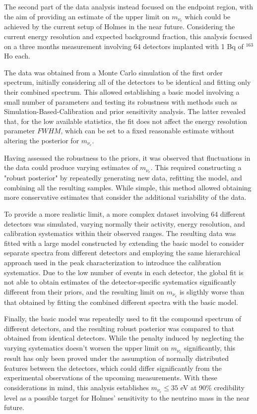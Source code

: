 The second part of the data analysis instead focused on the endpoint region, with the aim of providing an estimate of the upper limit on \(m_{\nu_{e}}\) which could be achieved by the current setup of Holmes in the near future. Considering the current energy resolution and expected background fraction, this analysis focused on a three months measurement involving 64 detectors implanted with 1 Bq of \(^{163}\)Ho each.

The data was obtained from a Monte Carlo simulation of the first order spectrum, initially considering all of the detectors to be identical and
fitting only their combined spectrum. This allowed establishing a basic model involving a small number of parameters
and testing its robustness with methods such as Simulation-Based-Calibration and prior sensitivity analysis. The latter
revealed that, for the low available statistics, the fit does not affect the energy resolution parameter \(FWHM\),
which can be set to a fixed reasonable estimate without altering the posterior for \(m_{\nu_{e}}\).

Having assessed the robustness to the priors, it was observed that fluctuations in the data could produce varying
estimates of \(m_{\nu_{e}}\). This required constructing a "robust posterior" by repeatedly generating new data,
refitting the model, and combining all the resulting samples. While simple, this method allowed obtaining more conservative estimates that consider the additional variability of the data.

To provide a more realistic limit, a more complex dataset involving 64 different detectors was simulated, varying normally their activity, energy
resolution, and calibration systematics within their observed ranges. The resulting data was fitted with a large model
constructed by extending the basic model to consider separate spectra from different detectors and employing the same hierarchical
approach used in the peak characterization to introduce the calibration systematics. Due to the low number of events in
each detector, the global fit is not able to obtain estimates of the detector-specific
systematics significantly different from their priors, and the resulting limit on \(m_{\nu_{e}}\) is sligthly worse than that obtained by fitting the combined different spectra with the basic model.

Finally, the basic model was repeatedly used to fit the compound spectrum of different detectors, and the resulting robust posterior was compared to that obtained from identical detectors.
While the penalty induced by neglecting the varying systematics doesn't worsen the upper limit on \(m_{\nu_{e}}\)
significantly, this result has only been proved under the assumption of normally distributed features between the
detectors, which could differ significantly from the experimental observations of the upcoming measurements. With these
considerations in mind, this analysis establishes $m_{\nu_{e}} \le 35$ eV at 90\% credibility level as a possible target for Holmes' sensitivity to the neutrino mass in the near future.
